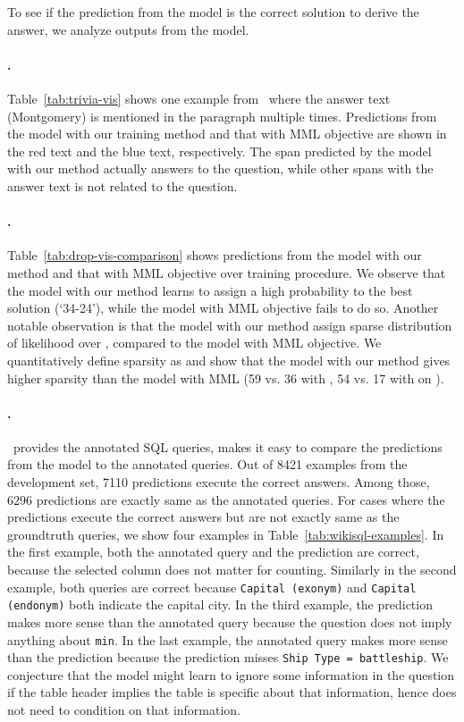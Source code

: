 \documentclass[11pt,a4paper]{article}
\begin{document}
To see if the prediction from the model is the correct solution to derive the answer, we analyze outputs from the model.

\paragraph{\trivia.} Table~\ref{tab:trivia-vis} shows one example from \trivia\  where the answer text (Montgomery) is mentioned in the paragraph multiple times. Predictions from the model with our training method and that with MML objective are shown in the red text and the blue text, respectively. The span predicted by the model with our method actually answers to the question, while other spans with the answer text is not related to the question.

\paragraph{\drop.} Table~\ref{tab:drop-vis-comparison} shows predictions from the model with our method and that with MML objective over training procedure. We observe that the model with our method learns to assign a high probability to the best solution (`34-24'), while the model with MML objective fails to do so.
Another notable observation is that the model with our method assign sparse distribution of likelihood over , compared to the model with MML objective. We quantitatively define sparsity as \citep{hurley2009comparing} and show that the model with our method gives higher sparsity than the model with MML (59 vs. 36 with , 54 vs. 17 with  on \drop).

\paragraph{\wikisql.} \wikisql\ provides the annotated SQL queries, makes it easy to compare the predictions from the model to the annotated queries. Out of 8421 examples from the development set, 7110 predictions execute the correct answers. Among those, 6296 predictions are exactly same as the annotated queries. For cases where the predictions execute the correct answers but are not exactly same as the groundtruth queries, we show four examples in Table~\ref{tab:wikisql-examples}. In the first example, both the annotated query and the prediction are correct, because the selected column does not matter for counting. Similarly in the second example, both queries are correct because \texttt{Capital (exonym)} and \texttt{Capital (endonym)} both indicate the capital city. In the third example, the prediction makes more sense than the annotated query because the question does not imply anything  about \texttt{min}. In the last example, the annotated query makes more sense than the prediction because the prediction misses \texttt{Ship Type = battleship}. We conjecture that the model might learn to ignore some information in the question if the table header implies the table is specific about that information, hence does not need to condition on that information. 
\end{document}
